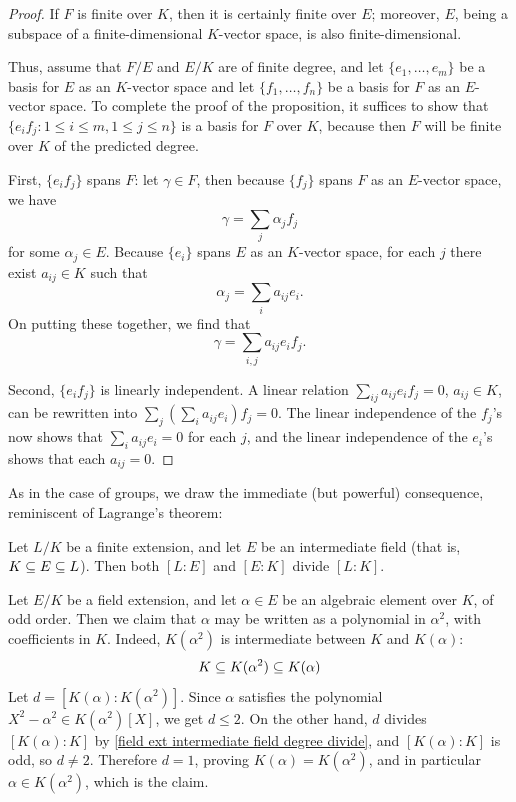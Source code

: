 \begin{proof}
If $F$ is finite over $K$, then it is certainly finite over $E$; moreover, $E$, being a subspace of a finite-dimensional $K$-vector space, is also finite-dimensional.\par
Thus, assume that $F/E$ and $E/K$ are of finite degree, and let $\{e_1,\dots,e_m\}$ be a basis for $E$ as an $K$-vector space and let $\{f_1,\dots,f_n\}$ be a basis for $F$ as an $E$-vector space. To complete the proof of the proposition, it suffices to show that $\{e_if_j:1\leq i\leq m,1\leq j\leq n\}$ is a basis for $F$ over $K$, because then $F$ will be finite over $K$ of the predicted degree.\par
First, $\{e_if_j\}$ spans $F$: let $\gamma\in F$, then because $\{f_j\}$ spans $F$ as an $E$-vector space, we have
\[\gamma=\sum_j\alpha_jf_j\]
for some $\alpha_j\in E$. Because $\{e_i\}$ spans $E$ as an $K$-vector space, for each $j$ there exist $a_{ij}\in K$ such that
\[\alpha_j=\sum_ia_{ij}e_i.\]
On putting these together, we find that
\[\gamma=\sum_{i,j}a_{ij}e_if_j.\]

Second, $\{e_if_j\}$ is linearly independent. A linear relation $\sum_{ij}a_{ij}e_if_j=0$, $a_{ij}\in K$, can be rewritten into $\sum_j(\sum_ia_{ij}e_i)f_j=0$. The linear independence of the $f_j$'s now shows that $\sum_ia_{ij}e_i=0$ for each $j$, and the linear independence of the $e_i$'s shows that each $a_{ij}=0$.
\end{proof}
As in the case of groups, we draw the immediate (but powerful) consequence, reminiscent of Lagrange's theorem:
\begin{corollary}\label{field ext intermediate field degree divide}
Let $L/K$ be a finite extension, and let $E$ be an intermediate field (that is, $K\subseteq E\subseteq L$). Then both $[L:E]$ and $[E:K]$ divide $[L:K]$.
\end{corollary}
\begin{example}
Let $E/K$ be a field extension, and let $\alpha\in E$ be an algebraic element over $K$, of odd order. Then we claim that $\alpha$ may be written as a polynomial in $\alpha^2$, with coefficients in $K$. Indeed, $K(\alpha^2)$ is intermediate between $K$ and $K(\alpha)$: 
\[K\subseteq K(\alpha^2)\subseteq K(\alpha)\]
Let $d=[K(\alpha):K(\alpha^2)]$. Since $\alpha$ satisfies the polynomial $X^2-\alpha^2\in K(\alpha^2)[X]$, we get $d\leq 2$. On the other hand, $d$ divides $[K(\alpha):K]$ by \cref{field ext intermediate field degree divide}, and $[K(\alpha):K]$ is odd, so $d\neq 2$. Therefore $d=1$, proving $K(\alpha)=K(\alpha^2)$, and in particular $\alpha\in K(\alpha^2)$, which is the claim.
\end{example}
